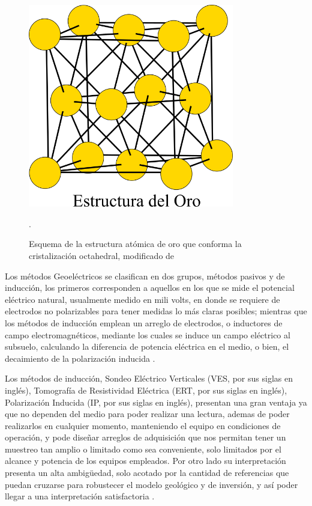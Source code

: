 			\begin{figure}[h!]
				\centering
				\includegraphics[width=9cm]{Imagenes/estructura-oro}
				\caption[Estructura atómica del oro]{Esquema de la estructura atómica de oro que conforma la cristalización octahedral, modificado de \citet{sorrell1973}}.
				\label{fig:eo}
			\end{figure}
			
			Los métodos Geoeléctricos se clasifican en dos grupos, métodos pasivos y de inducción, los primeros corresponden a aquellos en los que se mide el potencial eléctrico natural, usualmente medido en mili volts, en donde se requiere de electrodos no polarizables para tener medidas lo más claras posibles; mientras que los métodos de inducción emplean un arreglo de electrodos, o inductores de campo electromagnéticos, mediante los cuales se induce un campo eléctrico al subsuelo, calculando la diferencia de potencia eléctrica en el medio, o bien, el decaimiento de la polarización inducida \citep{revil2013, reynolds2011, igboama2023}.
			
			Los métodos de inducción, Sondeo Eléctrico Verticales (VES, por sus siglas en inglés), Tomografía de Resistividad Eléctrica (ERT, por sus siglas en inglés), Polarización Inducida (IP, por sus siglas en inglés), presentan una gran ventaja ya que no dependen del medio para poder realizar una lectura, ademas de poder realizarlos en cualquier momento, manteniendo el equipo en condiciones de operación, y pode diseñar arreglos de adquisición que nos permitan tener un muestreo tan amplio o limitado como sea conveniente, solo limitados por el alcance y potencia de los equipos empleados. Por otro lado su interpretación presenta un alta ambigüedad, solo acotado por la cantidad de referencias que puedan cruzarse para robustecer el modelo geológico y de inversión, y así poder llegar a una interpretación satisfactoria \citep{reynolds2011, igboama2023}.
			

